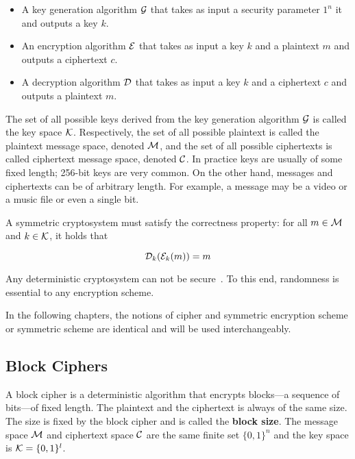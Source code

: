 \begin{itemize}
  \item A key generation algorithm $\mathcal{G}$ that takes as input a security parameter $1^{n}$ it and outputs a key $k$.
  \item An encryption algorithm $\mathcal{E}$ that takes as input a key $k$ and a plaintext $m$ and outputs a ciphertext $c$.
  \item A decryption algorithm $\mathcal{D}$ that takes as input a key $k$ and a ciphertext $c$ and outputs a plaintext $m$.
\end{itemize}

The set of all possible keys derived from the key generation algorithm $\mathcal{G}$ is called the key space $\mathcal{K}$. Respectively, the set of all possible plaintext is called the plaintext message space, denoted $\mathcal{M}$, and the set of all possible ciphertexts is called ciphertext message space, denoted $\mathcal{C}$. In practice keys are usually of some fixed length; 256-bit keys are very common. On the other hand, messages and ciphertexts can be of arbitrary length. For example, a message may be a video or a music file or even a single bit.

A symmetric cryptosystem must satisfy the correctness property: for all $m \in \mathcal{M}$ and $k \in \mathcal{K}$, it holds that

\begin{equation*}
  \mathcal{D}_{k}(\mathcal{E}_{k}(m)) = m
\end{equation*}

Any deterministic cryptosystem can not be secure~\cite{Katz:2014:IMC:2700550, kiagias:crypto}. To this end, randomness is essential to any encryption scheme.

In the following chapters, the notions of cipher and symmetric encryption scheme or symmetric scheme are identical and will be used interchangeably.

\subsection{Block Ciphers}
\label{preliminaries:sym:block}

A block cipher is a deterministic algorithm that encrypts blocks---a sequence of bits---of fixed length. The plaintext and the ciphertext is always of the same size. The size is fixed by the block cipher and is called the \textbf{block size}. The message space $\mathcal{M}$ and ciphertext space $\mathcal{C}$ are the same finite set $\{ 0, 1\}^{n}$ and the key space is  $\mathcal{K} = \{ 0, 1\}^{l}$.

